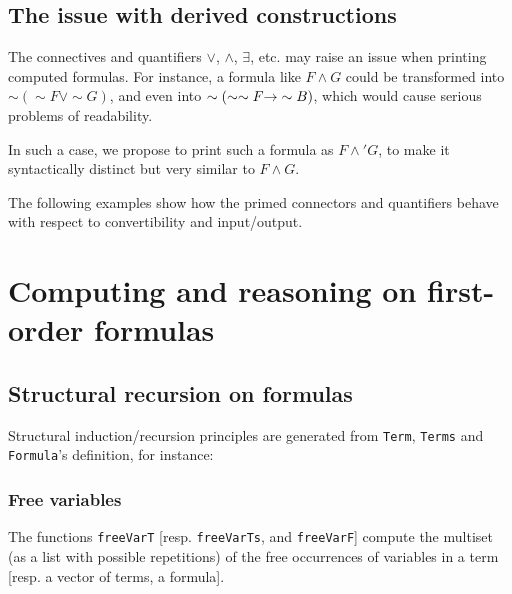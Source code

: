 

\subsection{The issue with derived constructions}
\label{sect:fol-issue}


The connectives and quantifiers $\vee$, $\wedge$, $\exists$, etc. may raise an issue when printing computed formulas.
For instance, a formula like $F \wedge G$ could be transformed into $\sim(\sim F \vee \sim G)$,  and even
into $\sim(\sim\sim F \mbox{$\rightarrow$} \sim B)$, which would 
cause serious problems of readability.

In such a case, we propose to print such a formula as $F \wedge' G$, to make it syntactically distinct but very similar to $F \wedge G$.


The following examples show how the primed connectors 
and quantifiers behave with respect to convertibility and 
input/output.














\section{Computing and reasoning on first-order formulas}


\subsection{Structural recursion on formulas}

Structural induction/recursion principles are generated from
\texttt{Term}, \texttt{Terms} and \texttt{Formula}'s definition, for instance:


\subsubsection{Free variables}
The functions \texttt{freeVarT} [resp. \texttt{freeVarTs},  and
\texttt{freeVarF}] compute the multiset (as a list with possible repetitions) of the free occurrences of variables in a term [resp. a vector of terms, a formula].

